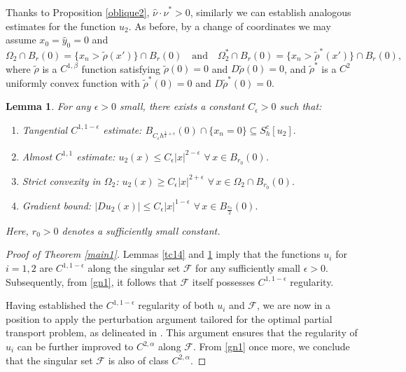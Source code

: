 \documentclass[11pt]{amsart}
\theoremstyle{plain}
\newtheorem{lemma}{Lemma}[section]
\newcommand{\0}{\textbf{0}}
\numberwithin{equation}{section}
\numberwithin{equation}{section}
\numberwithin{figure}{section}
\begin{document}
Thanks to Proposition \ref{oblique2}, $\hat{\nu} \cdot \hat{\nu}^* > 0$, similarly we can establish analogous estimates for the function $u_2$. 
As before, by a change of coordinates we may assume \( x_0 = \hat y_0 = 0 \) and \[
\Omega_2 \cap B_r(0) = \{x_n > \tilde\rho(x')\} \cap B_r(0) \quad \text{and} \quad \Omega_2^* \cap B_r(0) = \{x_n > \tilde\rho^*(x')\} \cap B_r(0),
\]
where \(\tilde \rho \) is a \( C^{1,\beta} \) function satisfying \( \tilde\rho(0) = 0 \) and \( D\tilde\rho(0) = 0 \), and \( \tilde\rho^* \) is a \( C^2 \) uniformly convex function with \( \tilde\rho^*(0) = 0 \) and \( D\tilde\rho^*(0) = 0 \). 
\begin{lemma}\label{tc141}
For any $\epsilon > 0$ small, there exists a constant $C_\epsilon > 0$ such that:
\begin{enumerate}
    \item Tangential $C^{1, 1-\epsilon}$ estimate: $B_{C_\epsilon h^{\frac{1}{2}+\epsilon}}(0) \cap \{x_n = 0\} \subseteq S_h^c[u_2].$
    \item Almost $C^{1, 1}$ estimate:  $u_2(x) \leq C_\epsilon |x|^{2 - \epsilon}$ $\forall\, x \in B_{r_0}(0)$.
  \item Strict convexity in $\Omega_2$:  $u_2(x) \geq C_\epsilon |x|^{2 + \epsilon}$ $\forall\, x \in \Omega_2 \cap B_{r_0}(0)$.  
    \item Gradient bound: $|Du_2(x)| \leq C_\epsilon |x|^{1 - \epsilon}$ $\forall\, x \in B_{\frac{r_0}{2}}(0).$
\end{enumerate}
Here, $r_0 > 0$ denotes a sufficiently small constant.
\end{lemma}


\begin{proof}[Proof of Theorem \ref{main1}]
Lemmas \ref{tc14} and \ref{tc141} imply that the functions \( u_i \) for \( i = 1, 2 \) are  \( C^{1,1-\epsilon} \) along the singular set \( \mathcal{F} \) for any sufficiently small \( \epsilon > 0 \). Subsequently, from \eqref{gn1}, it follows that \( \mathcal{F} \) itself possesses \( C^{1,1-\epsilon} \) regularity.

Having established the $C^{1,1-\epsilon}$ regularity of both $u_i$ and $\mathcal{F}$, we are now in a position to apply the perturbation argument tailored for the optimal partial transport problem, as delineated in \cite[Section 4]{CLW3}. This argument ensures that the regularity of $u_i$ can be further improved to $C^{2,\alpha}$ along $\mathcal{F}$. From \eqref{gn1} once more, we conclude that the singular set $\mathcal{F}$ is also of class $C^{2,\alpha}$.
\end{proof}
\end{document}
